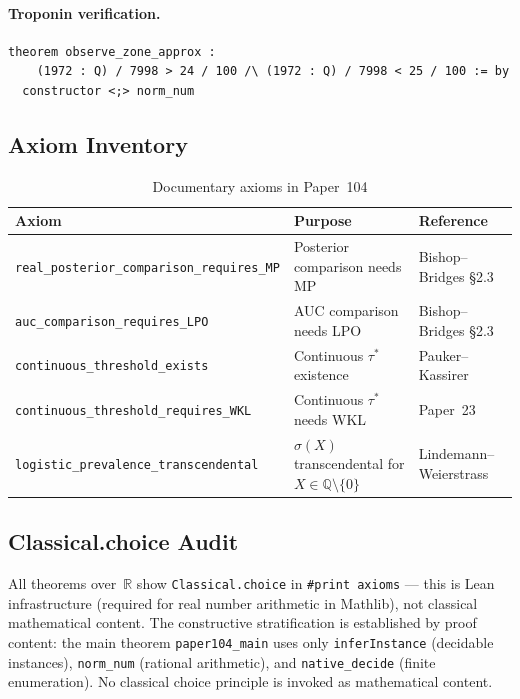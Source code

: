 \documentclass[11pt,a4paper]{article}
\theoremstyle{plain}
\theoremstyle{definition}
\newcommand{\Q}{\mathbb{Q}}
\newcommand{\R}{\mathbb{R}}
\begin{document}
\paragraph{Troponin verification.}

\begin{tcolorbox}[leanbox={TroponinCalculations.lean — Grey Zone Fraction}]
\begin{lstlisting}
theorem observe_zone_approx :
    (1972 : Q) / 7998 > 24 / 100 /\ (1972 : Q) / 7998 < 25 / 100 := by
  constructor <;> norm_num
\end{lstlisting}
\end{tcolorbox}

\subsection{Axiom Inventory}

\begin{table}[ht]
\centering
\caption{Documentary axioms in Paper~104}
\label{tab:axioms}
\begin{tabular}{lll}
\toprule
Axiom & Purpose & Reference \\
\midrule
\texttt{real\_posterior\_comparison\_requires\_MP} & Posterior comparison needs MP & Bishop--Bridges \S2.3 \\
\texttt{auc\_comparison\_requires\_LPO} & AUC comparison needs LPO & Bishop--Bridges \S2.3 \\
\texttt{continuous\_threshold\_exists} & Continuous $\tau^*$ existence & Pauker--Kassirer \\
\texttt{continuous\_threshold\_requires\_WKL} & Continuous $\tau^*$ needs WKL & Paper~23 \\
\texttt{logistic\_prevalence\_transcendental} & $\sigma(X)$ transcendental for $X \in \Q \setminus \{0\}$ & Lindemann--Weierstrass \\
\bottomrule
\end{tabular}
\end{table}

\subsection{Classical.choice Audit}

All theorems over~$\R$ show \texttt{Classical.choice} in \texttt{\#print axioms} --- this is Lean infrastructure (required for real number arithmetic in Mathlib), not classical mathematical content.  The constructive stratification is established by proof content: the main theorem \texttt{paper104\_main} uses only \texttt{inferInstance} (decidable instances), \texttt{norm\_num} (rational arithmetic), and \texttt{native\_decide} (finite enumeration).  No classical choice principle is invoked as mathematical content.
\end{document}
